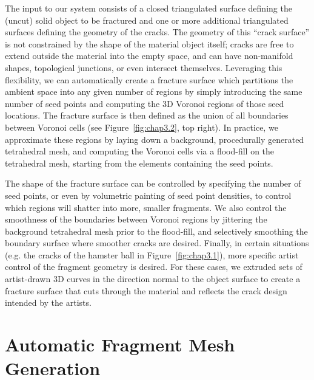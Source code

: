 The input to our system consists of a closed triangulated surface
defining the (uncut) solid object to be fractured and one or more additional
triangulated surfaces defining the geometry of the cracks.
The geometry of this ``crack surface'' is not constrained by the shape
of the material object itself; cracks are free to extend outside the
material into the empty space, and can have non-manifold shapes,
topological junctions, or even intersect themselves. Leveraging this
flexibility, we can automatically create a fracture surface which partitions
the ambient space into any given number of regions by simply
introducing the same number of seed points and computing the
3D Voronoi regions of those seed locations. The fracture surface is
then defined as the union of all boundaries between Voronoi cells
(see Figure~\ref{fig:chap3.2}, top right). In practice, we approximate these regions
by laying down a background, procedurally generated tetrahedral
mesh, and computing the Voronoi cells via a flood-fill on the tetrahedral
mesh, starting from the elements containing the seed points.

The shape of the fracture surface can be controlled by specifying the
number of seed points, or even by volumetric painting of seed point
densities, to control which regions will shatter into more, smaller
fragments. We also control the smoothness of the boundaries between
Voronoi regions by jittering the background tetrahedral mesh
prior to the flood-fill, and selectively smoothing the boundary surface
where smoother cracks are desired. Finally, in certain situations
(e.g. the cracks of the hamster ball in Figure~\ref{fig:chap3.1}), more specific
artist control of the fragment geometry is desired. For these cases,
we extruded sets of artist-drawn 3D curves in the direction normal
to the object surface to create a fracture surface that cuts through
the material and reflects the crack design intended by the artists.

\section{Automatic Fragment Mesh Generation}

